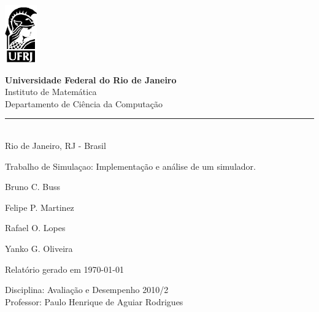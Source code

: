 \documentclass[a4paper,10pt]{article}
\begin{document}
\begin{titlepage}

\begin{minipage}{0.2\linewidth}
 \includegraphics[]{./minerva.png}
\end{minipage}
\begin{minipage}{0.8\linewidth}
 \textbf{Universidade Federal do Rio de Janeiro}\\
 Instituto de Matemática\\
 Departamento de Ciência da Computação\\
 \rule{0.8\linewidth}{0.5mm}\\
 Rio de Janeiro, RJ - Brasil
\end{minipage}

\begin{center}

\vspace{2cm}

\Large
Trabalho de Simulaçao: Implementação e análise de um simulador.

\vspace{1cm}

\large

Bruno C. Buss

\vspace{0.5cm}

Felipe P. Martinez

\vspace{0.5cm}

Rafael O. Lopes

\vspace{0.5cm}

Yanko G. Oliveira

\vspace{1.5cm}

Relatório gerado em \today

\normalsize
\end{center}

\vfill

\begin{flushright}
Disciplina: Avaliação e Desempenho 2010/2\\
Professor: Paulo Henrique de Aguiar Rodrigues\\
\end{flushright}

\vspace{2cm}

\end{titlepage}
\end{document}
